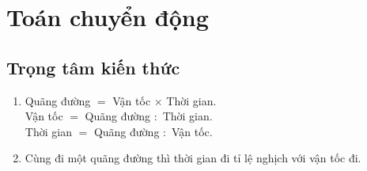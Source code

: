 
\section{Toán chuyển động}
\subsection{Trọng tâm kiến thức}
\begin{enumerate}
	\item Quãng đường $=$ Vận tốc $\times$ Thời gian.\\
	Vận tốc $=$ Quãng đường $:$ Thời gian.\\
	Thời gian $=$ Quãng đường $:$ Vận tốc.
	\item Cùng đi một quãng đường thì thời gian đi tỉ lệ nghịch với vận tốc đi.
\end{enumerate}
